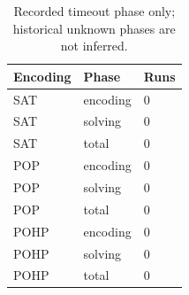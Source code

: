 \begin{table}[htbp]
\centering
\caption{Recorded timeout phase only; historical unknown phases are not inferred.}
\label{tab:p1-Repeated-timeout-phases}
\begin{tabular}{lll}
\hline
Encoding & Phase & Runs \\
\hline
SAT & encoding & 0 \\
SAT & solving & 0 \\
SAT & total & 0 \\
POP & encoding & 0 \\
POP & solving & 0 \\
POP & total & 0 \\
POHP & encoding & 0 \\
POHP & solving & 0 \\
POHP & total & 0 \\
\hline
\end{tabular}
\end{table}
